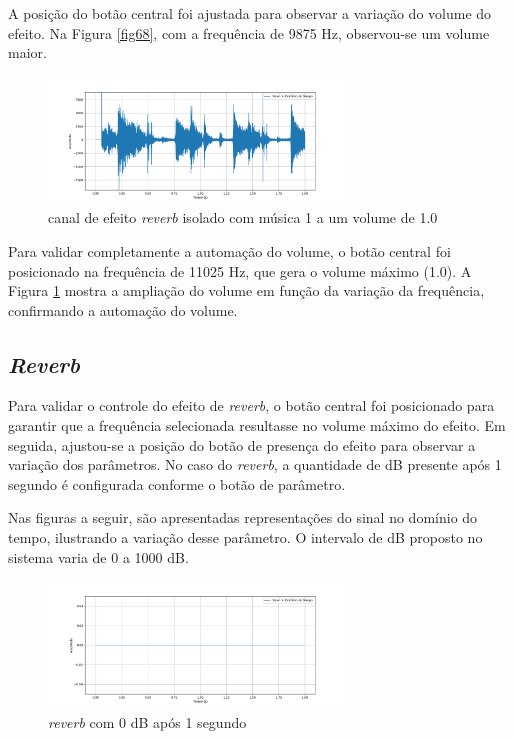 A posição do botão central foi ajustada para observar a variação do volume do efeito. Na Figura \ref{fig68}, com a frequência de 9875 Hz, observou-se um volume maior.

\begin{figure}[h]
    \centering
    \includegraphics[width=0.7\textwidth]{figuras/fig69.png}
    \caption{canal de efeito \textit{reverb} isolado com música 1 a um volume de 1.0}
    \label{fig69}
\end{figure}
Para validar completamente a automação do volume, o botão central foi posicionado na frequência de 11025 Hz, que gera o volume máximo (1.0). A Figura \ref{fig69} mostra a ampliação do volume em função da variação da frequência, confirmando a automação do volume.

\subsection{\textit{Reverb}}

Para validar o controle do efeito de \textit{reverb}, o botão central foi posicionado para garantir que a frequência selecionada resultasse no volume máximo do efeito. Em seguida, ajustou-se a posição do botão de presença do efeito para observar a variação dos parâmetros. No caso do \textit{reverb}, a quantidade de dB presente após 1 segundo é configurada conforme o botão de parâmetro.

Nas figuras a seguir, são apresentadas representações do sinal no domínio do tempo, ilustrando a variação desse parâmetro. O intervalo de dB proposto no sistema varia de 0 a 1000 dB.


\begin{figure}[h]
    \centering
    \includegraphics[width=0.7\textwidth]{figuras/fig70.png}
    \caption{\textit{reverb} com 0 dB após 1 segundo}
    \label{fig70}
\end{figure}

